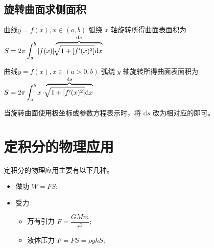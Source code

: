 \subsection{旋转曲面求侧面积}

曲线$ y = f(x),x\in(a,b) $ 弧绕 $ x $ 轴旋转所得曲面表面积为
$ \displaystyle S = 2\pi\int_a^b|f(x)|\overbrace{\displaystyle\sqrt[]{1+[f'(x)^2]}\mathrm{d}x}^{\mathrm{d}s} $ 

曲线$ y = f(x),x\in(a > 0,b) $ 弧绕 $ y $ 轴旋转所得曲面表面积为
$ \displaystyle S = 2\pi\int_a^bx\cdot\overbrace{\displaystyle\sqrt[]{1+[f'(x)^2]}\mathrm{d}x}^{\mathrm{d}s} $ 

当旋转曲面使用极坐标或参数方程表示时，将 $ \mathrm{d}s $ 改为相对应的即可。

\section{定积分的物理应用}
定积分的物理应用主要有以下几种。

\begin{itemize}
    \item 做功 $ W = FS; $ 
    \item 受力 \begin{itemize}
        \item 万有引力 $ F = \dfrac{GMm}{r^2}; $ 
        \item 液体压力 $ F = PS = \rho ghS; $ 
    \end{itemize}
\end{itemize}

